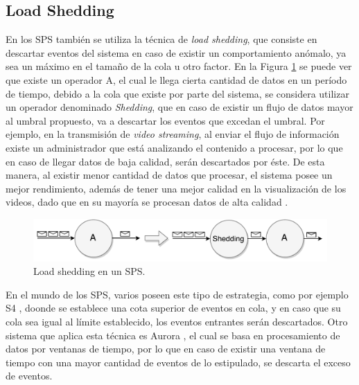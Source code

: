 \subsection{Load Shedding}
\label{sec:loadSheddingBC}

En los SPS también se utiliza la técnica de \textit{load shedding}, que consiste en descartar eventos del sistema en caso de existir un comportamiento anómalo, ya sea un máximo en el tamaño de la cola u otro factor. En la Figura \ref{fig:loadShedding} se puede ver que existe un operador A, el cual le llega cierta cantidad de datos en un período de tiempo, debido a la cola que existe por parte del sistema, se considera utilizar un operador denominado \textit{Shedding}, que en caso de existir un flujo de datos mayor al umbral propuesto, va a descartar los eventos que excedan el umbral. Por ejemplo, en la transmisión de \textit{video streaming}, al enviar el flujo de información existe un administrador que está analizando el contenido a procesar, por lo que en caso de llegar datos de baja calidad, serán descartados por éste. De esta manera, al existir menor cantidad de datos que procesar, el sistema posee un mejor rendimiento, además de tener una mejor calidad en la visualización de los videos, dado que en su mayoría se procesan datos de alta calidad \citep{SheuC09}. 

\begin{figure}[!ht]
	\centering
	\includegraphics[scale=0.6]{images/LoadShedding.pdf}
	\caption{Load shedding en un SPS.}
	\label{fig:loadShedding}
\end{figure}

En el mundo de los SPS, varios poseen este tipo de estrategia, como por ejemplo S4 \citep{s4}, doonde se establece una cota superior de eventos en cola, y en caso que su cola sea igual al límite establecido, los eventos entrantes serán descartados. Otro sistema que aplica esta técnica es Aurora \citep{aurora}, el cual se basa en procesamiento de datos por ventanas de tiempo, por lo que en caso de existir una ventana de tiempo con una mayor cantidad de eventos de lo estipulado, se descarta el exceso de eventos.


